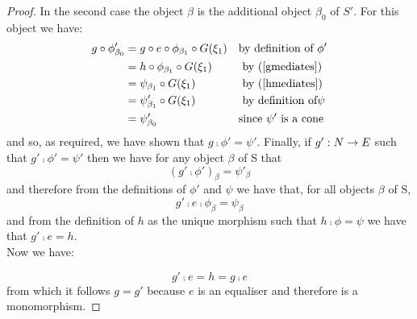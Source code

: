 \documentclass[10pt,a4paper]{scrartcl}
\begin{document}
\begin{proof}
\noindent
In the second case the object $\beta$ is the additional object $\beta_0$ of $S'$. For this object we have:
\begin{align*}
g \circ \phi'_{\beta_0}
   & = g \circ e \circ \phi_{\beta_1} \circ G(\xi_1)  && \mbox{by definition of }\phi' \\ 
             & = h \circ \phi_{\beta_1} \circ G(\xi_1) && \mbox{ by (\ref{gmediates})} \\
             & = \psi_{\beta_1}  \circ G(\xi_1)       && \mbox{ by (\ref{hmediates})} \\
						 & = \psi'_{\beta_1} \circ G(\xi_1)       && \mbox{ by definition of} \psi \\
						& = \psi'_{\beta_0}                        && \mbox{since }\psi' \mbox{ is a cone} \\ 
\end{align*}
and so, as required, we have shown that 
$g \comp \phi' = \psi'$.
\noindent Finally, if $g':N \rightarrow E$ such that $g' \comp \phi' = \psi'$ then we have 
for any object $\beta$ of S that
$$(g'\comp\phi')_\beta = \psi'_\beta$$
\noindent
and therefore from the definitions of $\phi'$ and $\psi$ we have
that, for all objects $\beta$ of S,
$$
g' \comp e \comp \phi_\beta = \psi_\beta
$$
\noindent
and  from the definition of $h$ as the unique morphism such that
$h \comp \phi = \psi$ we have that 
$g' \comp e = h$.\\

\noindent
Now we have:
 
$$g' \comp e = h = g \comp e$$
from which it follows $g=g'$ because $e$ is an equaliser and therefore is a monomorphism. 
\end{proof}


\end{document}
